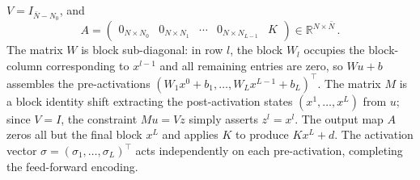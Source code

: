 $V = I_{\bar{N}-N_0}$, and
\begin{equation*}
    A = \begin{pmatrix} 0_{N \times N_0} & 0_{N \times N_1} & \cdots & 0_{N \times N_{L-1}} & K \end{pmatrix} \in \mathbb{R}^{N \times \bar{N}} \, .
\end{equation*}
The matrix $W$ is block sub-diagonal: in row $l$, the block $W_l$ occupies the block-column corresponding to $x^{l-1}$ and all remaining entries are zero, so $Wu + b$ assembles the pre-activations $(W_1 x^0 + b_1, \ldots, W_L x^{L-1} + b_L)^\top$. The matrix $M$ is a block identity shift extracting the post-activation states $(x^1, \ldots, x^L)$ from $u$; since $V = I$, the constraint $Mu = Vz$ simply asserts $z^l = x^l$. The output map $A$ zeros all but the final block $x^L$ and applies $K$ to produce $Kx^L + d$. The activation vector $\sigma = (\sigma_1, \ldots, \sigma_L)^\top$ acts independently on each pre-activation, completing the feed-forward encoding.

